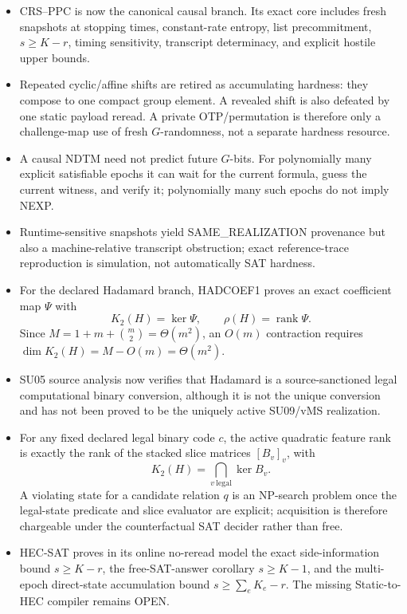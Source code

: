 \documentclass[11pt]{article}
\begin{document}
\begin{itemize}
  \item CRS--PPC is now the canonical causal branch. Its exact core includes fresh snapshots at
  stopping times, constant-rate entropy, list precommitment, \(s\ge K-r\), timing sensitivity,
  transcript determinacy, and explicit hostile upper bounds.
  \item Repeated cyclic/affine shifts are retired as accumulating hardness: they compose to one
  compact group element. A revealed shift is also defeated by one static payload reread.
  A private OTP/permutation is therefore only a challenge-map use of fresh \(G\)-randomness,
  not a separate hardness resource.
  \item A causal NDTM need not predict future \(G\)-bits. For polynomially many explicit
  satisfiable epochs it can wait for the current formula, guess the current witness, and verify it;
  polynomially many such epochs do not imply NEXP.
  \item Runtime-sensitive snapshots yield SAME_REALIZATION provenance but also a machine-relative
  transcript obstruction; exact reference-trace reproduction is simulation, not automatically SAT hardness.
  \item For the declared Hadamard branch, HADCOEF1 proves an exact coefficient map \(\Psi\) with
  \[
  \boxed{K_2(H)=\ker\Psi,\qquad \rho(H)=\operatorname{rank}\Psi.}
  \]
  Since \(M=1+m+\binom m2=\Theta(m^2)\), an \(O(m)\) contraction requires
  \(\dim K_2(H)=M-O(m)=\Theta(m^2)\).
  \item SU05 source analysis now verifies that Hadamard is a source-sanctioned legal computational
  binary conversion, although it is not the unique conversion and has not been proved to be the
  uniquely active SU09/vMS realization.
  \item For any fixed declared legal binary code \(c\), the active quadratic feature rank is exactly
  the rank of the stacked slice matrices \([B_v]_v\), with
  \[
  K_2(H)=\bigcap_{v\ \mathrm{legal}}\ker B_v.
  \]
  A violating state for a candidate relation \(q\) is an NP-search problem once the legal-state
  predicate and slice evaluator are explicit; acquisition is therefore chargeable under the
  counterfactual SAT decider rather than free.
  \item HEC-SAT proves in its online no-reread model the exact side-information bound
  \(s\ge K-r\), the free-SAT-answer corollary \(s\ge K-1\), and the multi-epoch direct-state
  accumulation bound \(s\ge\sum_e K_e-r\). The missing Static-to-HEC compiler remains OPEN.

\end{itemize}
\end{document}
